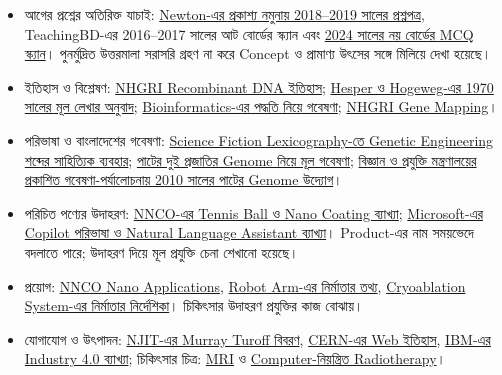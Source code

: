 \begin{itemize}
\item আগের প্রশ্নের অতিরিক্ত যাচাই: \href{https://newtonpublications.com/ebook/hsc_tp_me/common/ICT.pdf}{Newton-এর প্রকাশ্য নমুনায় 2018--2019 সালের প্রশ্নপত্র}, TeachingBD-এর 2016--2017 সালের আট বোর্ডের স্ক্যান এবং \href{https://onetimeschool.com/hsc-exam/hsc-information-and-communication-technology-multiple-choice-question-solution-2024/4323/}{2024 সালের নয় বোর্ডের MCQ স্ক্যান}। পুনর্মুদ্রিত উত্তরমালা সরাসরি গ্রহণ না করে Concept ও প্রামাণ্য উৎসের সঙ্গে মিলিয়ে দেখা হয়েছে।
\item ইতিহাস ও বিশ্লেষণ: \href{https://www.genome.gov/25520302/online-education-kit-1972-first-recombinant-dna}{NHGRI Recombinant DNA ইতিহাস}; \href{https://arxiv.org/abs/2111.11832}{Hesper ও Hogeweg-এর 1970 সালের মূল লেখার অনুবাদ}; \href{https://pubmed.ncbi.nlm.nih.gov/11552348/}{Bioinformatics-এর পদ্ধতি নিয়ে গবেষণা}; \href{https://www.genome.gov/genetics-glossary/Gene-Mapping}{NHGRI Gene Mapping}।
\item পরিভাষা ও বাংলাদেশের গবেষণা: \href{https://www.catb.org/~esr/sf-words/glossary.html}{Science Fiction Lexicography-তে Genetic Engineering শব্দের সাহিত্যিক ব্যবহার}; \href{https://www.nature.com/articles/nplants2016223}{পাটের দুই প্রজাতির Genome নিয়ে মূল গবেষণা}; \href{https://cdn.most.gov.bd/image/64accaccd1f27}{বিজ্ঞান ও প্রযুক্তি মন্ত্রণালয়ের প্রকাশিত গবেষণা-পর্যালোচনায় 2010 সালের পাটের Genome উদ্যোগ}।
\item পরিচিত পণ্যের উদাহরণ: \href{https://www.nano.gov/sites/default/files/ScavengerHunt.pdf}{NNCO-এর Tennis Ball ও Nano Coating ব্যাখ্যা}; \href{https://learn.microsoft.com/en-us/copilot/glossary}{Microsoft-এর Copilot পরিভাষা ও Natural Language Assistant ব্যাখ্যা}। Product-এর নাম সময়ভেদে বদলাতে পারে; উদাহরণ দিয়ে মূল প্রযুক্তি চেনা শেখানো হয়েছে।
\item প্রয়োগ: \href{https://www.nano.gov/about-nanotechnology/applications-nanotechnology/}{NNCO Nano Applications}, \href{https://www.universal-robots.com/media/1828411/ur-product-factsheets-ur10e-06_2023-en-version-5-1-4-3.pdf}{Robot Arm-এর নির্মাতার তথ্য}, \href{https://www.bostonscientific.com/content/dam/elabeling/pi/visual-ice/51696695-01A_VISUAL-ICE_Manual_ML_s.pdf}{Cryoablation System-এর নির্মাতার নির্দেশিকা}। চিকিৎসার উদাহরণ প্রযুক্তির কাজ বোঝায়।
\item যোগাযোগ ও উৎপাদন: \href{https://news.njit.edu/murray-turoff-pioneer-instant-messaging}{NJIT-এর Murray Turoff বিবরণ}, \href{https://home.cern/science/computing/the-birth-of-the-web/}{CERN-এর Web ইতিহাস}, \href{https://www.ibm.com/think/topics/industry-4-0}{IBM-এর Industry 4.0 ব্যাখ্যা}; চিকিৎসার চিত্র: \href{https://www.radiologyinfo.org/en/info/pediatric-mri}{MRI} ও \href{https://www.radiologyinfo.org/en/info/imrt}{Computer-নিয়ন্ত্রিত Radiotherapy}।
\end{itemize}
